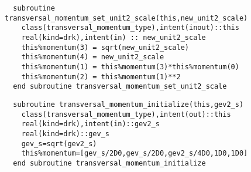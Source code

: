 \begin{Verbatim}
  subroutine transversal_momentum_set_unit2_scale(this,new_unit2_scale)
    class(transversal_momentum_type),intent(inout)::this
    real(kind=drk),intent(in) :: new_unit2_scale
    this%momentum(3) = sqrt(new_unit2_scale)
    this%momentum(4) = new_unit2_scale
    this%momentum(1) = this%momentum(3)*this%momentum(0)
    this%momentum(2) = this%momentum(1)**2
  end subroutine transversal_momentum_set_unit2_scale
\end{Verbatim}

\begin{Verbatim}
  subroutine transversal_momentum_initialize(this,gev2_s)
    class(transversal_momentum_type),intent(out)::this
    real(kind=drk),intent(in)::gev2_s
    real(kind=drk)::gev_s
    gev_s=sqrt(gev2_s)
    this%momentum=[gev_s/2D0,gev_s/2D0,gev2_s/4D0,1D0,1D0]
  end subroutine transversal_momentum_initialize
\end{Verbatim}
